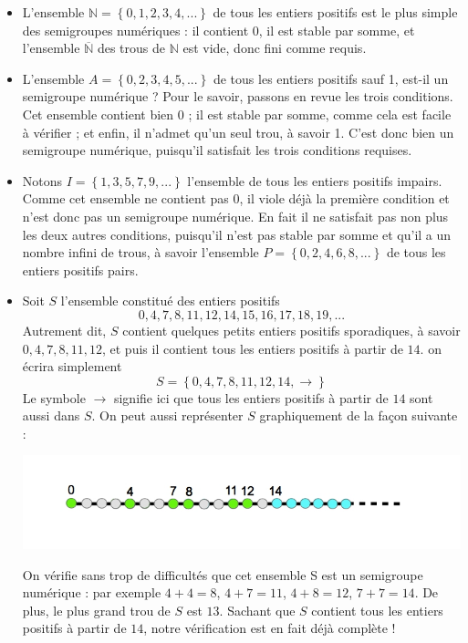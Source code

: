 \begin{example}
 \begin{itemize}
    \item L'ensemble $\mathbb{N}=\left\lbrace 0, 1, 2, 3, 4,... \right\rbrace$ de tous les entiers positifs est le plus simple    des semigroupes numériques : il contient $0$, il est stable par somme, et l’ensemble $\overline{\mathbb{N}}$ des trous de $\mathbb{N}$ est vide, donc fini comme requis.
   \item L’ensemble $A=\left\lbrace 0,2,3,4,5,...\right\rbrace$ de tous les entiers positifs sauf 1, est-il un semigroupe numérique ? Pour le savoir, passons en revue les trois conditions. Cet ensemble contient bien $0$ ; il est stable par somme, comme cela est facile à vérifier ; et enfin, il n’admet qu’un seul trou, à savoir 1. C’est donc bien un semigroupe numérique, puisqu’il satisfait les trois conditions requises.
   \item Notons $I=\left\lbrace 1,3,5,7,9,...\right\rbrace$ l’ensemble de tous les entiers positifs impairs. Comme cet ensemble ne contient pas $0$, il viole déjà la première condition et n’est donc pas un semigroupe numérique. En fait il ne satisfait pas non plus les deux autres conditions, puisqu’il n’est pas stable par somme et qu’il a un nombre infini de trous, à savoir l’ensemble $P=\left\lbrace 0,2,4,6,8,...\right\rbrace$ de tous les entiers positifs pairs.
   \item Soit $S$ l’ensemble constitué des entiers positifs 
     \[
       0,4,7,8,11,12,14,15,16,17,18,19,...
     \]
Autrement dit, $S$ contient quelques petits entiers positifs sporadiques, à savoir $0,4,7,8,11,12$, et puis il contient tous les entiers positifs à partir de $14$. on écrira simplement
 \[
 	S = \left\lbrace 0,4, 7, 8,11, 12, 14, \longrightarrow  \right\rbrace
 \]
 Le symbole $\longrightarrow$ signifie ici que tous les entiers positifs à partir de $14$ sont aussi dans $S$. On peut aussi représenter $S$ graphiquement de la façon suivante :
  \begin{center}
    \includegraphics[scale=0.5]{../Pictures/gratte-ciel5.jpg} 
  \end{center}

On vérifie sans trop de difficultés que cet ensemble S est un semigroupe numérique : par exemple $4+4=8$, $4+7=11$, $4+8=12$, $7+7=14$. De plus, le plus grand trou de $S$ est $13$. Sachant que $S$ contient tous les entiers positifs à partir de $14$, notre vérification est en fait déjà complète !
 \end{itemize}
\end{example}


